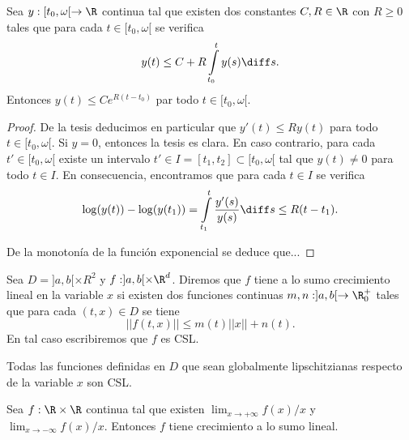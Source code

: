 \documentclass{article}
\begin{document}
\begin{lemma}
  Sea $y:[t_0, \omega[ \to \R$ continua tal que existen dos constantes $C, R \in \R$ con $R \ge 0$
  tales que para cada $t \in [t_0, \omega[$ se verifica
  \[ y(t) \le C + R \int\limits_{t_0}^{t} y(s) \diff s. \] Entonces $y(t) \le C e^{R(t-t_0)}$ par
  todo $t \in [t_0, \omega[$.
\end{lemma}
\begin{proof}
  De la tesis deducimos en particular que $y'(t) \le R y(t)$ para todo $t \in [t_0, \omega[$. Si
  $y = 0$, entonces la tesis es clara. En caso contrario, para cada $t' \in [t_0, \omega[$ existe un
  intervalo $t' \in I = [t_1, t_2] \subset [t_0, \omega[$ tal que $y(t) \ne 0$ para todo $t \in
  I$. En consecuencia, encontramos que para cada $t \in I$ se verifica
  \[ \log(y(t)) - \log(y(t_1)) = \int\limits_{t_1}^{t} \frac{y'(s)}{y(s)} \diff s \le R(t-t_1).\]

  De la monotonía de la función exponencial se deduce que...

\end{proof}

\begin{definition}
  Sea $D = ]a,b[ \times R^2$ y $f: ]a,b[\times\R^d$. Diremos que $f$ tiene a lo sumo crecimiento
  lineal en la variable $x$ si existen dos funciones continuas $m, n : ]a,b[ \to \R^+_0$ tales que
  para cada $(t,x) \in D$ se tiene
  \[ ||f(t,x)|| \le m(t) ||x|| + n(t).\] En tal caso escribiremos que $f$ es CSL.
\end{definition}

\begin{remark}
  Todas las funciones definidas en $D$ que sean globalmente lipschitzianas respecto de la variable
  $x$ son CSL.
\end{remark}

\begin{remark}
  Sea $f : \R \times \R$ continua tal que existen $\lim_{x \to +\infty} f(x)/x$ y
  $\lim_{x \to -\infty} f(x)/x$. Entonces $f$ tiene crecimiento a lo sumo lineal.
\end{remark}
\end{document}
